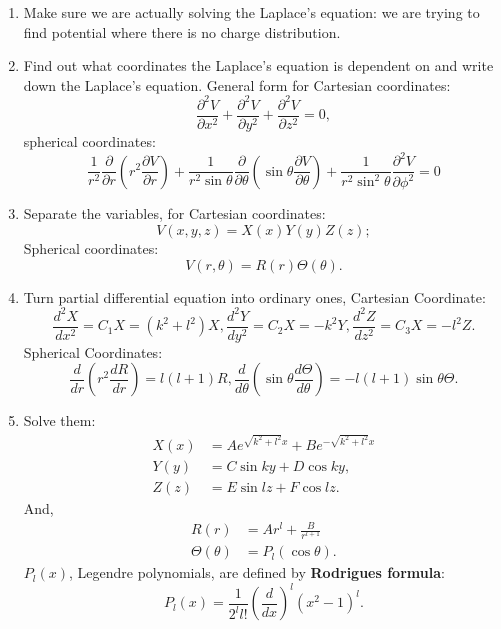 \documentclass{report}
\begin{document}
\begin{enumerate}
    \item Make sure we are actually solving the Laplace's equation: we are trying to find potential where there is no charge distribution. 
    \item Find out what coordinates the Laplace's equation is dependent on and write down the Laplace's equation. General form for Cartesian coordinates: 
    \begin{equation}
        \frac{\partial^2 V}{\partial x^2}  + \frac{\partial^2 V}{\partial y^2} + \frac{\partial^2 V}{\partial z^2} = 0,
    \end{equation}
    spherical coordinates: 
    \begin{equation}
        \frac{1}{r^2} \frac{\partial}{\partial r} \left( r^2 \frac{\partial V}{\partial r}\right) + \frac{1}{r^2 \sin{\theta}} \frac{\partial}{\partial \theta} \left( \sin{\theta} \frac{\partial V}{\partial \theta} \right) + \frac{1}{r^2 \sin^2{\theta}}\frac{\partial^2 V}{\partial \phi^2} = 0
    \end{equation}
    
    \item Separate the variables, for Cartesian coordinates: 
    \begin{equation}
        V(x,y,z) = X(x)Y(y)Z(z);
    \end{equation}
    Spherical coordinates: 
    \begin{equation}
        V(r,\theta) = R(r)\Theta(\theta).
    \end{equation}
    
    \item Turn partial differential equation into ordinary ones, Cartesian Coordinate: 
    \begin{equation}
        \frac{d^2X}{dx^2} = C_1 X = (k^2 + l^2)X, \frac{d^2Y}{dy^2} = C_2 X = -k^2 Y, \frac{d^2Z}{dz^2} = C_3 X = -l^2 Z.
    \end{equation}
    Spherical Coordinates: 
    \begin{equation}
    \frac{d}{dr}\left( r^2 \frac{dR}{dr}\right) = l(l+1)R, \frac{d}{d\theta}\left(\sin{\theta} \frac{d\Theta}{d\theta}\right) = -l(l+1)\sin{\theta}\Theta.
    \end{equation}
    
    \item Solve them:
    \begin{align}
        X(x) &= Ae^{\sqrt{k^2 + l^2}x} + B e^{-\sqrt{k^2 + l^2}x}\\
        Y(y) &= C\sin{ky} + D\cos{ky},\\
        Z(z) &= E\sin{lz} + F\cos{lz}. 
    \end{align}
    And, 
    \begin{align}
        R(r) &= A r^l + \frac{B}{r^{l+1}}\\
        \Theta(\theta) &= P_l(\cos{\theta}).
    \end{align}
    $P_l(x)$, Legendre polynomials, are defined by \textbf{Rodrigues formula}: 
    \begin{equation}
        P_l(x) = \frac{1}{2^l l!} \left( \frac{d}{dx}\right)^l (x^2 - 1)^l.
    \end{equation}
    

\end{enumerate}
\end{document}
